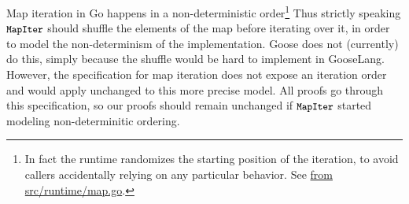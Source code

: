 Map iteration in Go happens in a non-deterministic order\footnote{In fact the
runtime randomizes the starting position of the iteration, to avoid callers
accidentally relying on any particular behavior. See
\href{https://github.com/golang/go/blob/c379c3d58d5482f4c8fe97466a99ce70e630ad44/src/runtime/map.go\#L844-L850}%
{ from src/runtime/map.go}.}
Thus strictly speaking $\cc{MapIter}$ should shuffle the elements of the map
before iterating over it, in order to model the non-determinism of the
implementation. Goose does not (currently) do this, simply because the shuffle would
be hard to implement in GooseLang. However, the specification for map iteration
does not expose an iteration order and would apply unchanged to this more
precise model. All proofs go through this specification, so our proofs should
remain unchanged if $\cc{MapIter}$ started modeling non-determinitic ordering.

